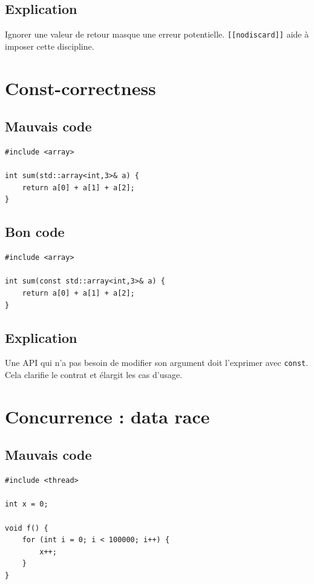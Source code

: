 \documentclass[a4paper,11pt]{report}
\begin{document}
\section{Explication}
Ignorer une valeur de retour masque une erreur potentielle.
\texttt{[[nodiscard]]} aide à imposer cette discipline.

\chapter{Const-correctness}

\section{Mauvais code}
\begin{lstlisting}
#include <array>

int sum(std::array<int,3>& a) {
    return a[0] + a[1] + a[2];
}
\end{lstlisting}

\section{Bon code}
\begin{lstlisting}
#include <array>

int sum(const std::array<int,3>& a) {
    return a[0] + a[1] + a[2];
}
\end{lstlisting}

\section{Explication}
Une API qui n'a pas besoin de modifier son argument doit l'exprimer avec \texttt{const}.
Cela clarifie le contrat et élargit les cas d'usage.

\chapter{Concurrence : data race}

\section{Mauvais code}
\begin{lstlisting}
#include <thread>

int x = 0;

void f() {
    for (int i = 0; i < 100000; i++) {
        x++;
    }
}
\end{lstlisting}
\end{document}
